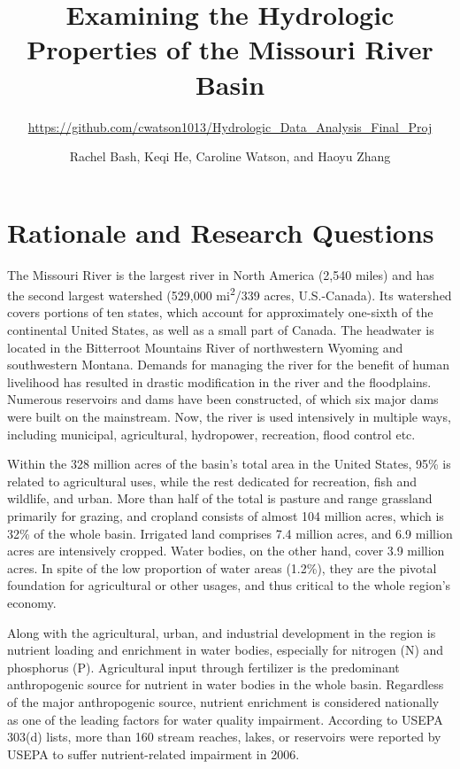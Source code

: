 \documentclass[12pt,]{article}
\title{Examining the Hydrologic Properties of the Missouri River Basin}
\subtitle{\url{https://github.com/cwatson1013/Hydrologic_Data_Analysis_Final_Proj}}
\author{Rachel Bash, Keqi He, Caroline Watson, and Haoyu Zhang}
\date{}
\begin{document}
\maketitle

\newpage

\hypertarget{rationale-and-research-questions}{%
\section{Rationale and Research
Questions}\label{rationale-and-research-questions}}

The Missouri River is the largest river in North America (2,540 miles)
and has the second largest watershed (529,000 mi\textsuperscript{2}/339
acres, U.S.-Canada). Its watershed covers portions of ten states, which
account for approximately one-sixth of the continental United States, as
well as a small part of Canada. The headwater is located in the
Bitterroot Mountains River of northwestern Wyoming and southwestern
Montana. Demands for managing the river for the benefit of human
livelihood has resulted in drastic modification in the river and the
floodplains. Numerous reservoirs and dams have been constructed, of
which six major dams were built on the mainstream. Now, the river is
used intensively in multiple ways, including municipal, agricultural,
hydropower, recreation, flood control etc.

Within the 328 million acres of the basin's total area in the United
States, 95\% is related to agricultural uses, while the rest dedicated
for recreation, fish and wildlife, and urban. More than half of the
total is pasture and range grassland primarily for grazing, and cropland
consists of almost 104 million acres, which is 32\% of the whole basin.
Irrigated land comprises 7.4 million acres, and 6.9 million acres are
intensively cropped. Water bodies, on the other hand, cover 3.9 million
acres. In spite of the low proportion of water areas (1.2\%), they are
the pivotal foundation for agricultural or other usages, and thus
critical to the whole region's economy.

Along with the agricultural, urban, and industrial development in the
region is nutrient loading and enrichment in water bodies, especially
for nitrogen (N) and phosphorus (P). Agricultural input through
fertilizer is the predominant anthropogenic source for nutrient in water
bodies in the whole basin. Regardless of the major anthropogenic source,
nutrient enrichment is considered nationally as one of the leading
factors for water quality impairment. According to USEPA 303(d) lists,
more than 160 stream reaches, lakes, or reservoirs were reported by
USEPA to suffer nutrient-related impairment in 2006.
\end{document}

